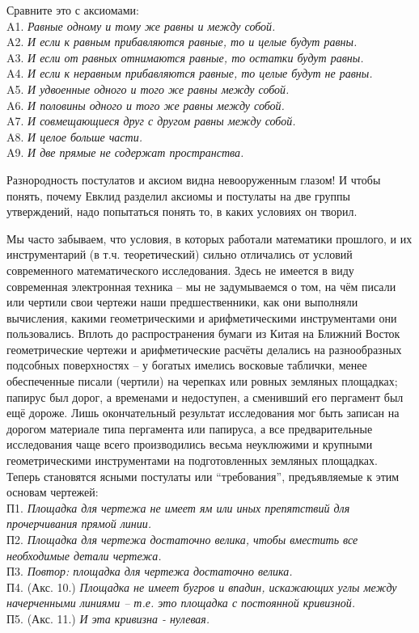Сравните это с аксиомами:
\\
A1. {\it Равные одному и тому же равны и между собой. }
\\
A2. {\it И если к равным прибавляются равные, то и целые будут равны.}
\\
A3. {\it И если от равных отнимаются равные, то остатки будут равны.}
\\
A4. {\it И если к неравным прибавляются равные, то целые будут не равны.}
\\
A5. {\it  И удвоенные одного и того же равны между собой.}
\\
A6. {\it И половины одного и того же равны между собой.}
\\
A7. {\it  И совмещающиеся друг с другом равны между собой.}
\\
A8. {\it И целое больше части.}
\\
A9. {\it И две прямые не содержат пространства.}

Разнородность постулатов и аксиом видна невооруженным глазом!
И чтобы понять, почему Евклид разделил аксиомы и постулаты на две группы утверждений, надо попытаться понять то, в каких условиях он творил.

Мы часто забываем, что условия, в которых работали математики прошлого, и их инструментарий (в т.ч. теоретический) сильно отличались от условий современного математического исследования.
Здесь не имеется в виду современная электронная техника -- мы не задумываемся о том, на чём писали или чертили свои чертежи наши предшественники, как они выполняли вычисления, какими геометрическими и арифметическими инструментами они пользовались.
Вплоть до распространения бумаги из Китая на Ближний Восток геометрические чертежи и арифметические расчёты делались на разнообразных подсобных поверхностях -- у богатых имелись восковые таблички, менее обеспеченные писали (чертили) на черепках или ровных земляных пло\-щад\-ках; папирус был дорог, а временами и недоступен, а сменивший его пергамент был ещё дороже.
Лишь окончательный результат исследования мог быть записан на дорогом материале типа пергамента или папируса, а все предварительные исследования чаще всего  производились весьма неуклюжими и крупными геометрическими инструментами на подготовленных земляных площадках.
Теперь становятся ясными постулаты или ``требования'', предъявляемые к этим основам чертежей:
\\
П1. {\it Площадка для чертежа не имеет ям или иных препятствий для прочерчивания прямой линии.}
\\
П2. {\it Пло\-щад\-ка для чер\-те\-жа до\-ста\-точ\-но ве\-ли\-ка, что\-бы \linebreak вмес\-тить все необходимые детали чертежа.}
\\
П3. {\it Повтор: площадка для чертежа достаточно велика.}
\\
П4. (Акс. 10.) {\it  Площадка не имеет бугров и впадин, искажающих углы между начерченными линиями -- т.е. это площадка с постоянной кривизной.}
\\
П5. (Акс. 11.) {\it  И эта кривизна - нулевая.}

